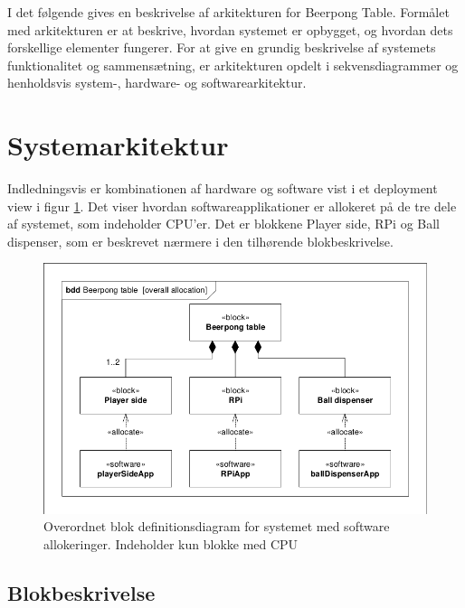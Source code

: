 \documentclass[Arkitektur/System_main.tex]{subfiles}
\begin{document}
I det følgende gives en beskrivelse af arkitekturen for Beerpong Table. Formålet med arkitekturen er at beskrive, hvordan systemet er opbygget, og hvordan dets forskellige elementer fungerer. For at give en grundig beskrivelse af systemets funktionalitet og sammensætning, er arkitekturen opdelt i sekvensdiagrammer og henholdsvis system-, hardware- og softwarearkitektur.

\section{Systemarkitektur} \label{sec:systemarkitektur}

 Indledningsvis er kombinationen af hardware og software vist i et deployment view i figur \ref{fig:systemarkitektur}. Det viser hvordan softwareapplikationer er allokeret på de tre dele af systemet, som indeholder CPU'er. Det er blokkene Player side, RPi og Ball dispenser, som er beskrevet nærmere i den tilhørende blokbeskrivelse.


\begin{figure}[H]
    \centering
    \includegraphics[width=1\textwidth,trim={0.24in 0.24in 0.24in 0.24in},clip, page=1]{Arkitektur/graphics/BDD_og_IBD.pdf}
    \caption{Overordnet blok definitionsdiagram for systemet med software allokeringer. Indeholder kun blokke med CPU}
    \label{fig:systemarkitektur}
\end{figure}

\subsection{Blokbeskrivelse}
\end{document}
